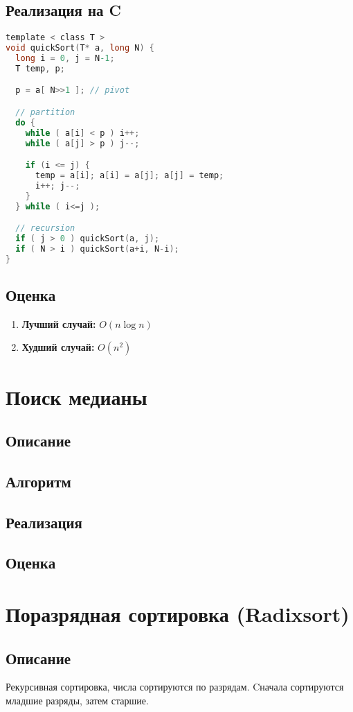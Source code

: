 \documentclass[a5paper,10pt]{article}
\begin{document}
		\subsection{Реализация на C}
			\begin{lstlisting}[frame=single,language=C]
template < class T >
void quickSort(T* a, long N) {
  long i = 0, j = N-1;
  T temp, p;

  p = a[ N>>1 ]; // pivot

  // partition
  do {
	while ( a[i] < p ) i++;
	while ( a[j] > p ) j--;

	if (i <= j) {
	  temp = a[i]; a[i] = a[j]; a[j] = temp;
	  i++; j--;
	}
  } while ( i<=j );

  // recursion
  if ( j > 0 ) quickSort(a, j);
  if ( N > i ) quickSort(a+i, N-i);
}
			\end{lstlisting}

		\subsection{Оценка}
			\begin{enumerate}
				\item \textbf{Лучший случай:} $ O(n \log n) $
				\item \textbf{Худший случай:} $ O(n^2) $
			\end{enumerate}

	\section{Поиск медианы}
		\subsection{Описание}
		\subsection{Алгоритм}
		\subsection{Реализация}
		\subsection{Оценка}

	\section{Поразрядная сортировка (Radixsort)}
		\subsection{Описание}
			Рекурсивная сортировка, числа сортируются по разрядам. Cначала сортируются младшие разряды, затем старшие.
\end{document}

